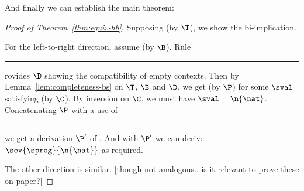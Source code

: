 And finally we can establish the main theorem:

\begin{proof}[Proof of Theorem~\ref{thm:equiv-hb}]
Supposing \trabsfinal{\bexp}{\sprog} (by $\T$), we show the bi-implication.

For the left-to-right direction, assume \bev{\envnil}{\bexp}{\n{\nat}} (by $\B$).
Rule \rule{D-Nil} provides $\D$ showing the compatibility of empty contexts.
Then by Lemma~\ref{lem:completeness-bs} on $\T$, $\B$ and $\D$, we get \ssteps{[\fr{[]}{\sprog}]}{[]}{[\fr{[]}{\send}]}{[\sval]} (by $\P$) for some $\sval$ satisfying \cor{\n{\nat}}{\sval} (by $\C$).
By inversion on $\C$, we must have $\sval = \n{\nat}$.
Concatenating $\P$ with a use of \rule{S-Ret}, we get a derivation $\P'$ of \ssteps{[\fr{[]}{\sprog}]}{[]}{[]}{[\n{\nat}]}.
And with $\P'$ we can derive $\sev{\sprog}{\n{\nat}}$ as required.

The other direction is similar. [though not analogous.. is it relevant to prove these on paper?]

\end{proof}
